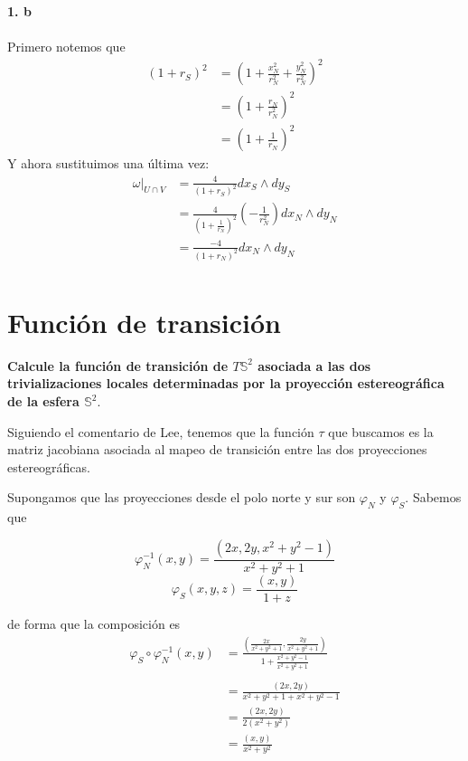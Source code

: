\documentclass[11pt]{article}
\theoremstyle{definition}
\begin{document}
\textbf{1. b}\\ \\
Primero notemos que
\begin{equation*}
    \begin{split}
        (1+r_S)^2&=\left(1+\frac{x_N^2}{r_N^2}+\frac{y^2_N}{r^2_N}\right)^2\\
        &=\left(1+\frac{r_N}{r_N^2}\right)^2\\
        &=\left(1+\frac{1}{r_N}\right)^2
    \end{split}
\end{equation*}
Y ahora sustituimos una última vez:
\begin{equation*}
    \begin{split}
        \omega|_{U\cap V}&=\frac{4}{(1+r_S)^2}dx_S\wedge dy_S\\
        &=\frac{4}{\left(1+\frac{1}{r_N}\right)^2}\left(-\frac{1}{r_N^2}\right)dx_N\wedge dy_N\\
        &=\frac{-4}{(1+r_N)^2}dx_N\wedge dy_N\\
    \end{split}
\end{equation*}

\newpage
\section*{Función de transición}
\textbf{Calcule la función de transición de $T\mathbb{S}^2$ asociada a las dos trivializaciones locales determinadas por la proyección estereográfica de la esfera $\mathbb{S}^2$}.\par
Siguiendo el comentario de Lee, tenemos que la función $\tau$ que buscamos es la matriz jacobiana asociada al mapeo de transición entre las dos proyecciones estereográficas.\par
Supongamos que las proyecciones desde el polo norte y sur son $\varphi_N$ y $\varphi_S$. Sabemos que

$$\varphi_N^{-1}(x,y)=\frac{(2x,2y,x^2+y^2-1)}{x^2+y^2+1}$$
$$\varphi_S(x,y,z)=\frac{(x,y)}{1+z}$$

de forma que la composición es
\begin{align*}    \varphi_S\circ\varphi_N^{-1}(x,y)&=\frac{(\frac{2x}{x^2+y^2+1},\frac{2y}{x^2+y^2+1})}{1+\frac{x^2+y^2-1}{x^2+y^2+1}}\\ \\
&=\frac{(2x,2y)}{x^2+y^2+1+x^2+y^2-1}\\
&=\frac{(2x,2y)}{2(x^2+y^2)}\\
&=\frac{(x,y)}{x^2+y^2}
\end{align*}
\end{document}
